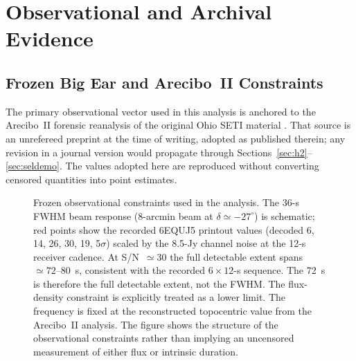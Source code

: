 \documentclass[twocolumn]{aastex701}
\begin{document}
\section{Observational and Archival Evidence}
\label{sec:observations}

\subsection{Frozen Big Ear and Arecibo~II Constraints}

The primary observational vector used in this analysis is anchored to the Arecibo~II forensic reanalysis of the original Ohio SETI material \citep{mendez2025}. That source is an unrefereed preprint at the time of writing, adopted as published therein; any revision in a journal version would propagate through Sections~\ref{sec:h2}--\ref{sec:seldemo}. The values adopted here are reproduced without converting censored quantities into point estimates.

\begin{figure}[ht!]
\caption{Frozen observational constraints used in the analysis. The 36-s FWHM beam response (8-arcmin beam at $\delta\simeq-27^\circ$) is schematic; red points show the recorded 6EQUJ5 printout values (decoded 6, 14, 26, 30, 19, 5$\sigma$) scaled by the 8.5-Jy channel noise at the 12-s receiver cadence. At S/N~$\simeq30$ the full detectable extent spans $\simeq72$--80~s, consistent with the recorded $6\times12$-s sequence. The 72~s is therefore the full detectable extent, not the FWHM. The flux-density constraint is explicitly treated as a lower limit. The frequency is fixed at the reconstructed topocentric value from the Arecibo~II analysis. The figure shows the structure of the observational constraints rather than implying an uncensored measurement of either flux or intrinsic duration.}
\label{fig:obs_constraints}
\end{figure}
\end{document}
